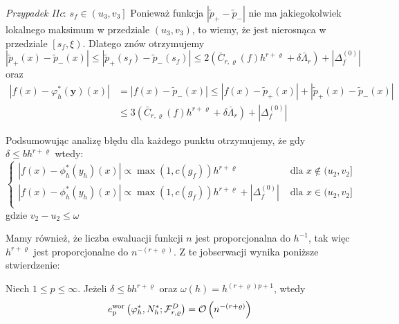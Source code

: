 \documentclass[oik, pdftex, robocza, man]{mgrwms}
\begin{document}
    \textit{Przypadek IIc}: $s_{f} \in\left(u_{3}, v_{3}\right]$
    Ponieważ funkcja $\left|\tilde{p}_{+}-\tilde{p}_{-}\right|$ nie ma jakiegokolwiek lokalnego maksimum w przedziale $\left(u_{3}, v_{3}\right)$, to wiemy, że jest nierosnąca w przedziale $\left[s_{f}, \xi\right)$. Dlatego znów otrzymujemy
    \begin{equation*}
        \left|\tilde{p}_{+}(x)-\tilde{p}_{-}(x)\right| \leq\left|\tilde{p}_{+}\left(s_{f}\right)-\tilde{p}_{-}\left(s_{f}\right)\right| \leq 2\left(\bar{C}_{r, \varrho}(f) h^{r+\varrho}+\delta \bar{\Lambda}_{r}\right)+\left|\Delta_{f}^{(0)}\right|        
    \end{equation*}
    oraz
    \begin{equation*}
        \begin{aligned}
            \left|f(x)-\varphi_{h}^{*}(\mathbf{y})(x)\right| &=\left|f(x)-\tilde{p}_{-}(x)\right| \leq\left|f(x)-\tilde{p}_{+}(x)\right|+\left|\tilde{p}_{+}(x)-\tilde{p}_{-}(x)\right| \\
            & \leq 3\left(\bar{C}_{r, \varrho}(f) h^{r+\varrho}+\delta \bar{\Lambda}_{r}\right)+\left|\Delta_{f}^{(0)}\right|
        \end{aligned}
    \end{equation*}

    Podsumowując analizę błędu dla każdego punktu otrzymujemy, że gdy $\delta \leq bh^{r+\varrho}$ wtedy:
    \begin{equation*}
        \begin{cases}
            |f(x) - \phi_{h}^{*}(y_{h})(x)| \propto \max(1, c(g_{f})) h^{r+\varrho} & \text{ dla } x \notin (u_{2}, v_{2}] \\
            |f(x) - \phi_{h}^{*}(y_{h})(x)| \propto \max(1, c(g_{f})) h^{r+\varrho} + |\Delta_{f}^{(0)}| & \text{ dla } x \in (u_{2}, v_{2}] \\
        \end{cases}
    \end{equation*}
    gdzie $v_{2} - u_{2} \leq \omega$

    Mamy również, że liczba ewaluacji funkcji $n$ jest proporcjonalna do $h^{-1}$, tak więc $h^{r+\varrho}$ jest proporcjonalne do $n^{-(r+\varrho)}$. Z te jobserwacji wynika poniższe stwierdzenie:
    \begin{stw}
        \label{stw2}
        Niech $1 \leq p \leq \infty$. Jeżeli $\delta \leq bh^{r+\varrho}$ oraz $\omega(h) = h^{(r+\varrho)p + 1}$, wtedy
        \begin{equation*}
            e_{\mathrm{p}}^{\mathrm{wor}}\left(\varphi_{h}^{*}, N_{h}^{*} ; \mathcal{F}_{r, \varrho}^{D}\right)=\mathcal{O}\left(n^{-(r+\varrho)}\right)
        \end{equation*}
    \end{stw}
\end{document}
